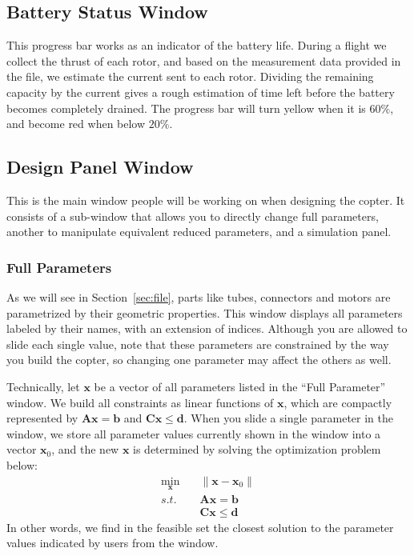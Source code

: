 \subsection{Battery Status Window}
This progress bar works as an indicator of the battery life. During a flight we collect the thrust of each rotor, and based on the measurement data provided in the file, we estimate the current sent to each rotor. Dividing the remaining capacity by the current gives a rough estimation of time left before the battery becomes completely drained. The progress bar will turn yellow when it is $60\%$, and become red when below $20\%$.

\subsection{Design Panel Window}
This is the main window people will be working on when designing the copter. It consists of a sub-window that allows you to directly change full parameters, another to manipulate equivalent reduced parameters, and a simulation panel.

\subsubsection{Full Parameters}
As we will see in Section~\ref{sec:file}, parts like tubes, connectors and motors are parametrized by their geometric properties. This window displays all parameters labeled by their names, with an extension of indices. Although you are allowed to slide each single value, note that these parameters are constrained by the way you build the copter, so changing one parameter may affect the others as well.

Technically, let $\mathbf{x}$ be a vector of all parameters listed in the ``Full Parameter'' window. We build all constraints as linear functions of $\mathbf{x}$, which are compactly represented by $\mathbf{Ax}=\mathbf{b}$ and $\mathbf{Cx}\leq\mathbf{d}$. When you slide a single parameter in the window, we store all parameter values currently shown in the window into a vector $\mathbf{x}_0$, and the new $\mathbf{x}$ is determined by solving the optimization problem below:
\begin{equation}
\begin{aligned}
\min_{\mathbf{x}}&\quad \|\mathbf{x} - \mathbf{x}_0\|\\
s.t.&\quad \mathbf{Ax}=\mathbf{b}\\
&\quad \mathbf{Cx}\leq\mathbf{d}
\end{aligned}
\end{equation}
In other words, we find in the feasible set the closest solution to the parameter values indicated by users from the window.

